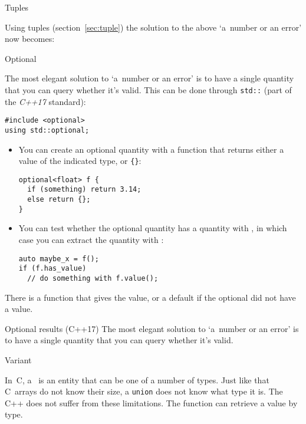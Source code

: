  {Tuples}

Using tuples (section~\ref{sec:tuple}) 
the solution to the above `a~number or an error' now becomes:
%

 {Optional}
\label{sec:std-optional}

The most elegant solution to `a~number or an error' is to have a
single quantity that you can query whether it's valid.
This can be done through \lstinline{std::}
(part of the \emph{C++17} standard):
\begin{lstlisting}
#include <optional>
using std::optional;
\end{lstlisting}

\begin{itemize}
\item You can create an optional quantity with a function that returns
  either a value of the indicated type, or \verb+{}+:
\begin{lstlisting}
optional<float> f {
  if (something) return 3.14;
  else return {};
}
\end{lstlisting}
\item You can test whether the optional quantity has a quantity with
  , in which case you can extract the quantity
  with :
\begin{lstlisting}
auto maybe_x = f();
if (f.has_value)
  // do something with f.value();
\end{lstlisting}
\end{itemize}

There is a function  that gives the value, or
a default if the optional did not have a value.

\begin{slide}{Optional results (C++17)}
  \label{sl:optional-root}
  The most elegant solution to `a~number or an error' is to have a
  single quantity that you can query whether it's valid.
\end{slide}

 {Variant}
\label{sec:stl-variant}

In~C, a~ is an entity that can be one of a number
of types. Just like that C~arrays do not know their size, a
\lstinline{union} does not know what type it is. The C++
 does not suffer from these limitations. The
function  can retrieve a value by type.

